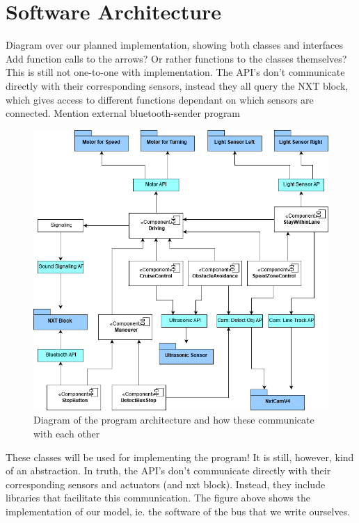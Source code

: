
\section{Software Architecture}

Diagram over our planned implementation, showing both classes and interfaces
Add function calls to the arrows? Or rather functions to the classes themselves?
This is still not one-to-one with implementation. The API's don't communicate directly with their corresponding sensors, instead they all query the NXT block, which gives access to different functions dependant on which sensors are connected.
Mention external bluetooth-sender program

\begin{figure}[h]
    \includegraphics[width=\textwidth]{Images/Design/architectureClassDiagram.png}
    \caption{Diagram of the program architecture and how these communicate with each other}
\end{figure}

These classes will be used for implementing the program! It is still, however, kind of an abstraction.
In truth, the API's don't communicate directly with their corresponding sensors and actuators (and nxt block). 
Instead, they include libraries that facilitate this communication. 
The figure above shows the implementation of our model, ie. the software of the bus that we write ourselves.

